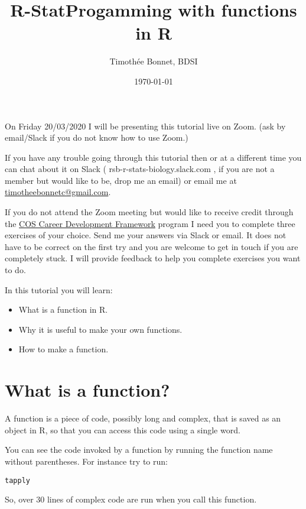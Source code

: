 \documentclass[12pt,a4paper]{scrartcl}\usepackage[]{graphicx}\usepackage[]{color}
\title{R-StatProgamming with functions in R}
\date{\today}
\author{Timoth\'ee Bonnet, BDSI}
\makeatletter
\newcommand{\hlstd}[1]{\textcolor[rgb]{0.345,0.345,0.345}{#1}}%
\newenvironment{kframe}{%
 \def\at@end@of@kframe{}%
 \ifinner\ifhmode%
  \def\at@end@of@kframe{\end{minipage}}%
  \begin{minipage}{\columnwidth}%
 \fi\fi%
 \def\FrameCommand##1{\hskip\@totalleftmargin \hskip-\fboxsep
 \colorbox{shadecolor}{##1}\hskip-\fboxsep
     \hskip-\linewidth \hskip-\@totalleftmargin \hskip\columnwidth}%
 \MakeFramed {\advance\hsize-\width
   \@totalleftmargin\z@ \linewidth\hsize
   \@setminipage}}%
 {\par\unskip\endMakeFramed%
 \at@end@of@kframe}
\newenvironment{knitrout}{}{} %
\makeatother
\begin{document}
\maketitle

On Friday 20/03/2020 I will be presenting this tutorial live on Zoom. (ask by email/Slack if you do not know how to use Zoom.)

If you have any trouble going through this tutorial then or at a different time you can chat about it on Slack ( rsb-r-stats-biology.slack.com , if you are not a member but would like to be, drop me an email) or email me at \href{mailto:timotheebonnetc@gmail.com}{timotheebonnetc@gmail.com}.

If you do not attend the Zoom meeting but would like to receive credit through the \href{https://wattlecourses.anu.edu.au/enrol/index.php?id=23938}{COS Career Development Framework} program I need you to complete three exercises of your choice. Send me your answers via Slack or email. It does not have to be correct on the first try and you are welcome to get in touch if you are completely stuck. I will provide feedback to help you complete exercises you want to do.

In this tutorial you will learn:

\begin{itemize}
    \item What is a function in R.
    \item Why it is useful to make your own functions.
    \item How to make a function.
\end{itemize}

\tableofcontents
\ListOfExerciseInToc
{}

\clearpage



\section{What is a function?}

A function is a piece of code, possibly long and complex, that is saved as an object in R, so that you can access this code using a single word.

You can see the code invoked by a function by running the function name without parentheses. For instance try to run:
\begin{knitrout}
\color{fgcolor}\begin{kframe}
\begin{alltt}
\hlstd{tapply}
\end{alltt}
\end{kframe}
\end{knitrout}
So, over 30 lines of complex code are run when you call this function.
\end{document}
